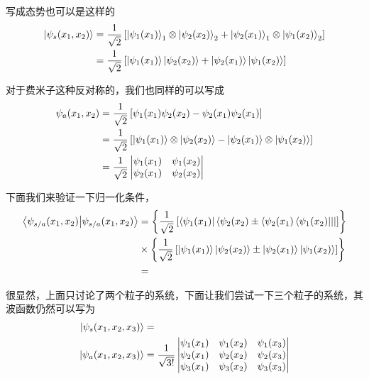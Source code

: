 \documentclass{article}
\newcommand{\vmtwo}[4]{\begin{vmatrix}#1&#2\\#3&#4\end{vmatrix}}
\newcommand{\vmthree}[9]{
    \begin{vmatrix}
        #1&#2&#3\\
        #4&#5&#6\\
        #7&#8&#9
    \end{vmatrix}
}
\begin{document}
写成态势也可以是这样的
\begin{align*}
	\ket{\psi_s(x_1,x_2)} & =\frac{1}{\sqrt{2}}\left[\ket{\psi_1(x_1)}_1\otimes\ket{\psi_2(x_2)}_2+\ket{\psi_2(x_1)}_1\otimes\ket{\psi_1(x_2)}_2\right] \\
	                      & =\frac{1}{\sqrt{2}}\left[\ket{\psi_1(x_1)}\ket{\psi_2(x_2)}+\ket{\psi_2(x_1)}\ket{\psi_1(x_2)}\right]
\end{align*}

对于费米子这种反对称的，我们也同样的可以写成
\begin{align*}
	\psi_{a}(x_1,x_2) & =\frac{1}{\sqrt{2}}\left[\psi_1(x_1)\psi_2(x_2)-\psi_2(x_1)\psi_2(x_1)\right]                                       \\
	                  & =\frac{1}{\sqrt{2}}\left[\ket{\psi_1(x_1)}\otimes\ket{\psi_2(x_2)}-\ket{\psi_2(x_1)}\otimes\ket{\psi_1(x_2)}\right] \\
	                  & =\frac{1}{\sqrt{2}}\vmtwo{\psi_1(x_1)}{\psi_1(x_2)}{\psi_2(x_1)}{\psi_2(x_2)}
\end{align*}

下面我们来验证一下归一化条件，
\begin{align*}
	\braket{\psi_{s/a}(x_1,x_2)}{\psi_{s/a}(x_1,x_2)} & =\left\{\frac{1}{\sqrt{2}}\left[\bra{\psi_1(x_1)}\bra{\psi_2(x_2)\pm\bra{\psi_2(x_1)\bra{\psi_1(x_2)}}}\right]\right\}      \\
	                                                  & \times\left\{\frac{1}{\sqrt{2}}\left[\ket{\psi_1(x_1)}\ket{\psi_2(x_2)}\pm\ket{\psi_2(x_1)}\ket{\psi_1(x_2)}\right]\right\} \\
	                                                  & =
\end{align*}

很显然，上面只讨论了两个粒子的系统，下面让我们尝试一下三个粒子的系统，其波函数仍然可以写为
\begin{align*}
	\ket{\psi_s(x_1,x_2,x_3)} & =                                                                                                                                                 \\
	\ket{\psi_a(x_1,x_2,x_3)} & =\frac{1}{\sqrt{3!}}\vmthree{\psi_1(x_1)}{\psi_1(x_2)}{\psi_1(x_3)}{\psi_2(x_1)}{\psi_2(x_2)}{\psi_2(x_3)}{\psi_3(x_1)}{\psi_3(x_2)}{\psi_3(x_3)}
\end{align*}
\end{document}
